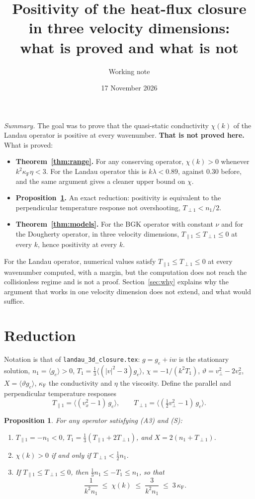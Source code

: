 \documentclass[11pt]{article}
\title{Positivity of the heat-flux closure in three velocity dimensions:\\
what is proved and what is not}
\author{Working note}
\date{17 November 2026}
\newcommand{\avg}[1]{\langle #1\rangle}
\newcommand{\Tpar}{T_{\parallel1}}
\newcommand{\Tperp}{T_{\perp1}}
\newtheorem{proposition}[theorem]{Proposition}
\theoremstyle{remark}
\begin{document}
\sloppy
\maketitle

\noindent\emph{Summary.} The goal was to prove that the quasi-static
conductivity $\chi(k)$ of the Landau operator is positive at every
wavenumber. \textbf{That is not proved here.} What is proved:
\begin{itemize}
  \item \textbf{Theorem~\ref{thm:range}.} For any conserving operator,
    $\chi(k)>0$ whenever $k^2\kappa_{\mathrm F}\eta<3$. For the Landau
    operator this is $k\lambda<0.89$, against $0.30$ before, and the same
    argument gives a cleaner upper bound on $\chi$.
  \item \textbf{Proposition~\ref{prop:red}.} An exact reduction: positivity
    is equivalent to the perpendicular temperature response not overshooting,
    $\Tperp<n_1/2$.
  \item \textbf{Theorem~\ref{thm:models}.} For the BGK operator with constant
    $\nu$ and for the Dougherty operator, in three velocity dimensions,
    $\Tpar\le\Tperp\le0$ at every $k$, hence positivity at every $k$.
\end{itemize}
For the Landau operator, numerical values satisfy $\Tpar\le\Tperp\le0$ at
every wavenumber computed, with a margin, but the computation does not reach
the collisionless regime and is not a proof. Section~\ref{sec:why} explains
why the argument that works in one velocity dimension does not extend, and
what would suffice.

\section{Reduction}

Notation is that of \texttt{landau\_3d\_closure.tex}: $g=g_e+iw$ is the
stationary solution, $n_1=\avg{g_e}>0$, $T_1=\tfrac13\avg{(|v|^2-3)g_e}$,
$\chi=-1/(k^2T_1)$, $\vartheta=v_\perp^2-2v_x^2$, $X=\avg{\vartheta g_e}$,
$\kappa_{\mathrm F}$ the conductivity and $\eta$ the viscosity. Define the
parallel and perpendicular temperature responses
\[
  \Tpar=\avg{(v_x^2-1)\,g_e},\qquad
  \Tperp=\avg{(\tfrac12v_\perp^2-1)\,g_e}.
\]

\begin{proposition}\label{prop:red}
For any operator satisfying (A3) and (S):
\begin{enumerate}
  \item[(i)] $\Tpar=-n_1<0$, $T_1=\tfrac13(\Tpar+2\Tperp)$, and
    $X=2(n_1+\Tperp)$.
  \item[(ii)] $\chi(k)>0$ if and only if $\Tperp<\tfrac12n_1$.
  \item[(iii)] If $\Tpar\le\Tperp\le0$, then
    $\tfrac13n_1\le-T_1\le n_1$, so that
    \[
      \frac{1}{k^2n_1}\;\le\;\chi(k)\;\le\;\frac{3}{k^2n_1}
      \;\le\;3\,\kappa_{\mathrm F}.
    \]
\end{enumerate}
\end{proposition}
\end{document}
